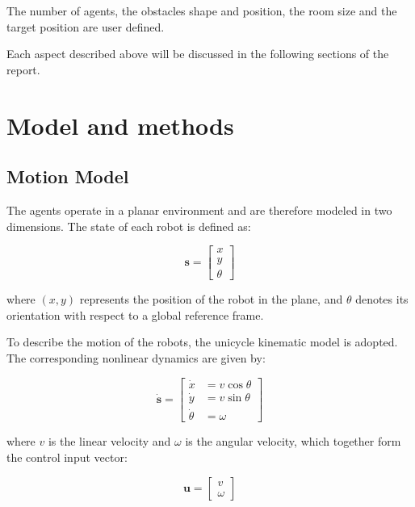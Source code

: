 \documentclass[times, twoside]{zHenriquesLab-StyleBioRxiv}
\begin{document}
The number of agents, the obstacles shape and position, the room size and the target position are user defined.

Each aspect described above will be discussed in the following sections of the report.






\section*{Model and methods}

\subsection{Motion Model}

The agents operate in a planar environment and are therefore modeled in two dimensions. The state of each robot is defined as:

\begin{equation}
    \mathbf{s} = 
    \begin{bmatrix}
        x \\
        y \\
        \theta
    \end{bmatrix}
\end{equation}

where $(x, y)$ represents the position of the robot in the plane, and $\theta$ denotes its orientation with respect to a global reference frame.

To describe the motion of the robots, the unicycle kinematic model is adopted. The corresponding nonlinear dynamics are given by:

\begin{equation}
\mathbf{\dot{s}} =
\left[
\begin{aligned}
    \dot{x} &= v \cos\theta \\
    \dot{y} &= v \sin\theta \\
    \dot{\theta} &= \omega
\end{aligned}
\right]
\label{eq:unicycle}
\end{equation}

where $v$ is the linear velocity and $\omega$ is the angular velocity, which together form the control input vector:

\begin{equation}
    \mathbf{u} =
    \begin{bmatrix}
        v \\
        \omega
    \end{bmatrix}
    \label{eq:control}
\end{equation}
\end{document}
